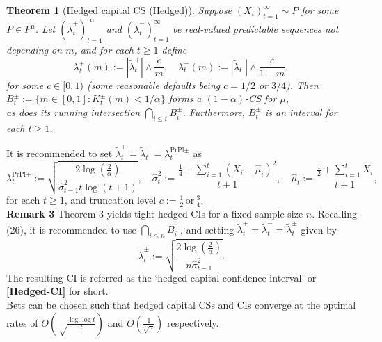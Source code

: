 \documentclass{article}
\renewcommand{\leq}{\leqslant}
\renewcommand{\geq}{\geqslant}
\newtheorem{theorem}{Theorem}
\begin{document}
\begin{theorem}[Hedged capital CS (Hedged)]  
Suppose \( (X_t)_{t=1}^{\infty} \sim P \) for some \( P \in P^{\mu} \). Let \( (\tilde{\lambda}^+_t)_{t=1}^{\infty} \) and \( (\tilde{\lambda}^-_t)_{t=1}^{\infty} \) be real-valued predictable sequences not depending on \( m \), and for each \( t \geq 1 \) define  
\begin{equation}  
\lambda^+_t (m) := |\tilde{\lambda}^+_t| \wedge \frac{c}{m}, \quad  
\lambda^-_t (m) := |\tilde{\lambda}^-_t| \wedge \frac{c}{1 - m},  
\end{equation}  
for some \( c \in [0,1) \) (some reasonable defaults being \( c = 1/2 \) or \( 3/4 \)). Then\\

$ B^\pm_t := \{ m \in [0,1] : K^\pm_t (m) < 1/\alpha \} $ forms a \( (1 - \alpha) \)-CS for \( \mu \), \\

as does its running intersection \( \bigcap_{i \leq t} B^\pm_i \). Furthermore, \( B^\pm_t \) is an interval for each \( t \geq 1 \).  
\end{theorem}  
It is recommended to set \( \tilde{\lambda}^+_t = \tilde{\lambda}^-_t = \lambda^{\text{PrPl}\pm}_t \) as
\begin{equation} \label{eq:26}
   \lambda^{\text{PrPl}\pm}_t := \sqrt{\frac{2 \log (\frac{2}{\alpha})}{\hat{\sigma}^2_{t-1}t \log (t + 1)}}, \quad \hat{\sigma}^2_t := \frac{\frac{1}{4} + \sum_{i=1}^{t} (X_i - \hat{\mu}_i)^2}{t + 1}, \quad \hat{\mu}_t := \frac{\frac{1}{2}+ \sum_{i=1}^{t} X_i}{t + 1},
\end{equation}
for each \( t \geq 1 \), and truncation level \( c := \frac{1}{2} \, \text{or} \, \frac{3}{4}
 \). \\
 
\noindent \textbf{Remark 3} \quad Theorem 3 yields tight hedged CIs for a fixed sample size \( n \). Recalling (26), it is recommended to use \( \bigcap_{i \leq n} B^\pm_i \), and setting \( \tilde{\lambda}^+_t = \tilde{\lambda}^-_t = \tilde{\lambda}^\pm_t \) given by
\begin{equation} \label{eq:27}
    \tilde{\lambda}^\pm_t := \sqrt{\frac{2 \log( \frac{2}{\alpha})}{n \hat{\sigma}^2_{t-1}}}.
\end{equation}
The resulting CI is referred as the ‘hedged capital confidence interval’ or \textbf{[Hedged-CI]} for short. \\

\noindent Bets can be chosen such that hedged capital CSs and CIs converge at the optimal rates of \( O \left( \sqrt\frac{\log \log t}{t} \right) \) and \( O \left( \frac{1}{\sqrt{n}} \right) \) respectively. \\ 
\end{document}
